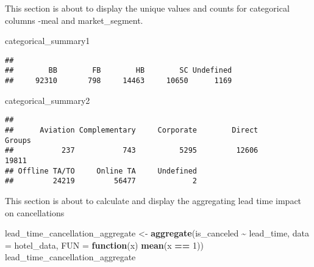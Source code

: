 \documentclass[
]{article}
\newenvironment{Shaded}{\begin{snugshade}}{\end{snugshade}}
\newcommand{\AttributeTok}[1]{\textcolor[rgb]{0.13,0.29,0.53}{#1}}
\newcommand{\ControlFlowTok}[1]{\textcolor[rgb]{0.13,0.29,0.53}{\textbf{#1}}}
\newcommand{\DecValTok}[1]{\textcolor[rgb]{0.00,0.00,0.81}{#1}}
\newcommand{\FunctionTok}[1]{\textcolor[rgb]{0.13,0.29,0.53}{\textbf{#1}}}
\newcommand{\NormalTok}[1]{#1}
\newcommand{\OtherTok}[1]{\textcolor[rgb]{0.56,0.35,0.01}{#1}}
\newcommand{\SpecialCharTok}[1]{\textcolor[rgb]{0.81,0.36,0.00}{\textbf{#1}}}
\begin{document}
This section is about to display the unique values and counts for
categorical columns -meal and market\_segment.

\begin{Shaded}
\begin{Highlighting}[]
\NormalTok{categorical\_summary1}
\end{Highlighting}
\end{Shaded}

\begin{verbatim}
## 
##        BB        FB        HB        SC Undefined 
##     92310       798     14463     10650      1169
\end{verbatim}

\begin{Shaded}
\begin{Highlighting}[]
\NormalTok{categorical\_summary2}
\end{Highlighting}
\end{Shaded}

\begin{verbatim}
## 
##      Aviation Complementary     Corporate        Direct        Groups 
##           237           743          5295         12606         19811 
## Offline TA/TO     Online TA     Undefined 
##         24219         56477             2
\end{verbatim}

This section is about to calculate and display the aggregating lead time
impact on cancellations

\begin{Shaded}
\begin{Highlighting}[]
\NormalTok{lead\_time\_cancellation\_aggregate }\OtherTok{\textless{}{-}} \FunctionTok{aggregate}\NormalTok{(is\_canceled }\SpecialCharTok{\textasciitilde{}}\NormalTok{ lead\_time, }\AttributeTok{data =}\NormalTok{ hotel\_data, }\AttributeTok{FUN =} \ControlFlowTok{function}\NormalTok{(x) }\FunctionTok{mean}\NormalTok{(x }\SpecialCharTok{==} \DecValTok{1}\NormalTok{))}
\NormalTok{lead\_time\_cancellation\_aggregate}
\end{Highlighting}
\end{Shaded}
\end{document}
